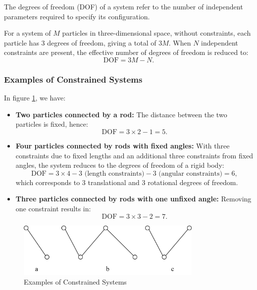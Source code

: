 \begin{definition}
    The degrees of freedom (DOF) of a system refer to the number of independent parameters required to specify its configuration.
\end{definition}

For a system of $M$ particles in three-dimensional space, without constraints, each particle has 3 degrees of freedom, giving a total of $3M$. When $N$ independent constraints are present, the effective number of degrees of freedom is reduced to:
\begin{equation}
    \text{DOF} = 3M - N.
\end{equation}

\subsubsection*{Examples of Constrained Systems}

In figure \ref{fig:1-1-1}, we have:

\begin{itemize}
    \item \textbf{Two particles connected by a rod:}
          The distance between the two particles is fixed, hence:
          \begin{equation}
              \text{DOF} = 3 \times 2 - 1 = 5.
          \end{equation}

    \item \textbf{Four particles connected by rods with fixed angles:}
          With three constraints due to fixed lengths and an additional three constraints from fixed angles, the system reduces to the degrees of freedom of a rigid body:
          \begin{equation}
              \text{DOF} = 3 \times 4 - 3 \text{ (length constraints)} - 3 \text{ (angular constraints)}
              = 6,
          \end{equation}
          which corresponds to 3 translational and 3 rotational degrees of freedom.

    \item \textbf{Three particles connected by rods with one unfixed angle:}
          Removing one constraint results in:
          \begin{equation}
              \text{DOF} = 3 \times 3 - 2 = 7.
          \end{equation}
\end{itemize}

\begin{figure}[ht]
    \centering
    \includegraphics[width=0.8\textwidth]{images/1-1-1.png}
    \caption{Examples of Constrained Systems}
    \label{fig:1-1-1}
\end{figure}

